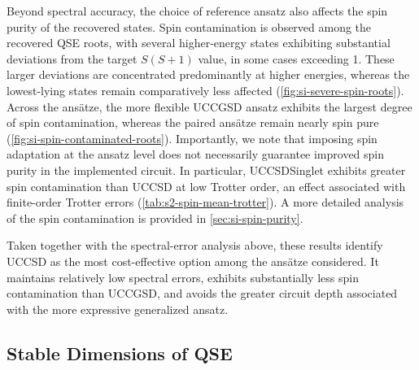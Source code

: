 Beyond spectral accuracy, the choice of reference ansatz also affects the spin purity of the recovered states.
Spin contamination is observed among the recovered QSE roots, with several higher-energy states exhibiting substantial deviations from the target $S(S+1)$ value, in some cases exceeding 1. 
These larger deviations are concentrated predominantly at higher energies, whereas the lowest-lying states remain comparatively less affected (\cref{fig:si-severe-spin-roots}).
Across the ansätze, the more flexible UCCGSD ansatz exhibits the largest degree of spin contamination, whereas the paired ansätze remain nearly spin pure (\cref{fig:si-spin-contaminated-roots}). 
Importantly, we note that imposing spin adaptation at the ansatz level does not necessarily guarantee improved spin purity in the implemented circuit. 
In particular, UCCSDSinglet exhibits greater spin contamination than UCCSD at low Trotter order, an effect associated with finite-order Trotter errors (\cref{tab:s2-spin-mean-trotter}).
A more detailed analysis of the spin contamination is provided in \cref{sec:si-spin-purity}.

Taken together with the spectral-error analysis above, these results identify UCCSD as the most cost-effective option among the ansätze considered. 
It maintains relatively low spectral errors, exhibits substantially less spin contamination than UCCGSD, and avoids the greater circuit depth associated with the more expressive generalized ansatz.


\subsection{Stable Dimensions of QSE}
